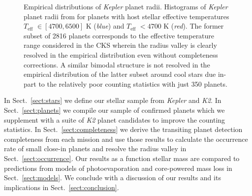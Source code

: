 \documentclass[twocolumn]{emulateapj}
\newcommand{\kepler}[1]{\emph{Kepler}#1}
\newcommand{\ktwo}[1]{\emph{K2}#1}
\newcommand{\teff}[1]{$T_{\text{eff}}$#1}
\begin{document}

\begin{figure}
  \centering
  \caption{Empirical distributions of \kepler{} planet radii. Histograms of \kepler{} planet radii
    from \cite{berger18} for planets with host stellar effective temperatures \teff{} $\in [4700,6500]$ K
    (\emph{blue}) and \teff{} $<4700$ K (\emph{red}). The former subset of 2816 planets corresponds to the
    effective temperature range considered in the CKS \citep{fulton17} wherein the radius valley is clearly
    resolved in the empirical distribution even without completeness corrections. A similar bimodal
    structure is not resolved in the empirical distribution of the latter subset around cool stars
    due in-part to the relatively poor counting statistics with just 350 planets.}
  \label{fig:berger}
\end{figure}


In Sect.~\ref{sect:stars} we define our stellar sample from \kepler{} and \ktwo{.}
In Sect.~\ref{sect:planets} we compile our sample of confirmed planets which we supplement with a
suite of \ktwo{} planet candidates to improve the counting statistics.
In Sect.~\ref{sect:completeness}
we derive the transiting planet detection completeness from each mission and use those results to calculate
the occurrence rate of small close-in planets and resolve the radius valley in Sect.~\ref{sect:occurrence}.
Our results as a function stellar mass are compared to
predictions from models of photoevaporation and core-powered mass loss in Sect.~\ref{sect:models}. We conclude 
with a discussion of our results and its implications in Sect.~\ref{sect:conclusion}.
\end{document}
